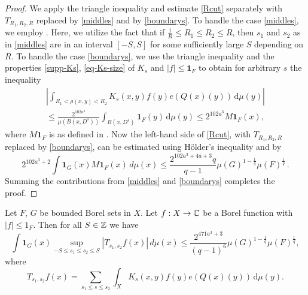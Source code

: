 \begin{proof}
We apply the triangle inequality and estimate \eqref{Rcut} separately with $T_{R_1,R_2,R}$ replaced by \eqref{middles} and by \eqref{boundarys}.
To handle the case \eqref{middles}, we employ . Here, we utilize the fact that if $\frac 1R\le R_1\le R_2\le R$, then $s_1$ and $s_2$ as in \eqref{middles} are in an interval $[-S,S]$ for some sufficiently large $S$ depending on $R$.
To handle the case \eqref{boundarys}, we use the triangle inequality and the properties \eqref{supp-Ks}, \eqref{eq-Ks-size} of $K_s$  and $|f| \le \mathbf{1}_F$ to obtain for arbitrary $s$ the inequality
\begin{multline}
\left|\int_{R_1 < \rho(x,y) < R_2} K_s(x,y) f(y) e(Q(x)(y)) \, \mathrm{d}\mu(y)\right|\\
\leq \frac{2^{102 a^3}}{\mu(B(x, D^{s}))}
 \int_{B(x, D^s)} \mathbf{1}_F(y) \, \mathrm{d}\mu(y)
\leq 2^{102 a^3} M\mathbf{1}_F(x),
\end{multline}
where $M\mathbf{1}_F$ is as defined in .
Now the left-hand side of \eqref{Rcut}, with $T_{R_1,R_2,R}$ replaced by \eqref{boundarys}, can be estimated using H\"older's inequality and  by
$$
    2^{102a^3+2}\int \mathbf{1}_{G}(x) M\mathbf{1}_F(x)\, d\mu(x)
    \le \frac{2^{102a^3+4a+3}q}{q-1}\mu(G)^{1-\frac{1}{q}} \mu(F)^{\frac{1}{q}}\,.
$$
Summing the contributions from \eqref{middles} and \eqref{boundarys} completes the proof.
\end{proof}

\begin{lemma}[S truncation]
    \label{S-truncation}
    \leanok
    Let $F$, $G$ be bounded Borel sets in $X$.
    Let $f:X\to \mathbb{C}$ be a Borel function with $|f|\le 1_F$. Then for all $S\in{\mathbb{Z}}$ we have
    \begin{equation} \label{Scut}
        \int \mathbf{1}_G(x) \sup_{-S\le s_1\le s_2\le S} |T_{s_1,s_2} f(x)|\, d\mu(x)
        \le \frac{2^{471a^3+3}}{(q-1)^6} \mu(G)^{1-\frac{1}{q}} \mu(F)^{\frac{1}{q}},
    \end{equation}
    where
    \begin{equation}\label{Tss}
        T_{s_1,s_2} f(x) = \sum_{s_1\le s \le s_2} \int_X K_s(x,y) f(y) e(Q(x)(y)) \, \mathrm{d}\mu(y).
    \end{equation}
\end{lemma}

